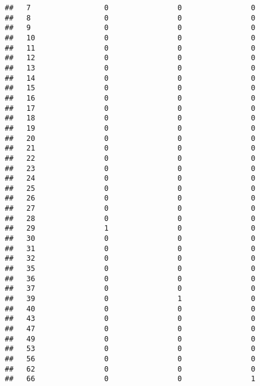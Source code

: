 \documentclass[]{article}
\newenvironment{Shaded}{\begin{snugshade}}{\end{snugshade}}
\newcommand{\CommentTok}[1]{\textcolor[rgb]{0.56,0.35,0.01}{\textit{#1}}}
\begin{document}
\begin{verbatim}
##   7                 0                0                0
##   8                 0                0                0
##   9                 0                0                0
##   10                0                0                0
##   11                0                0                0
##   12                0                0                0
##   13                0                0                0
##   14                0                0                0
##   15                0                0                0
##   16                0                0                0
##   17                0                0                0
##   18                0                0                0
##   19                0                0                0
##   20                0                0                0
##   21                0                0                0
##   22                0                0                0
##   23                0                0                0
##   24                0                0                0
##   25                0                0                0
##   26                0                0                0
##   27                0                0                0
##   28                0                0                0
##   29                1                0                0
##   30                0                0                0
##   31                0                0                0
##   32                0                0                0
##   35                0                0                0
##   36                0                0                0
##   37                0                0                0
##   39                0                1                0
##   40                0                0                0
##   43                0                0                0
##   47                0                0                0
##   49                0                0                0
##   53                0                0                0
##   56                0                0                0
##   62                0                0                0
##   66                0                0                1
\end{verbatim}

\begin{Shaded}
\end{Shaded}
\end{document}
